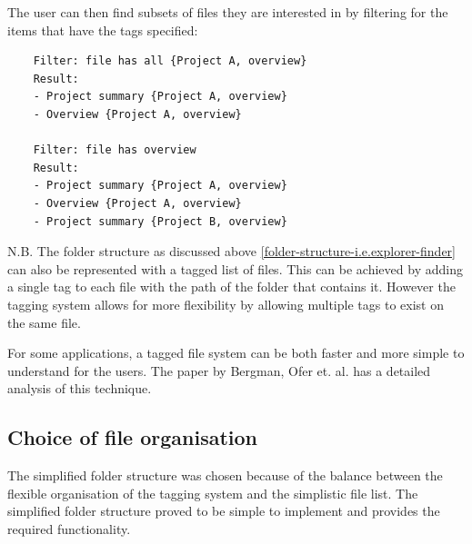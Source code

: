 The user can then find subsets of files they are interested in by
filtering for the items that have the tags specified:

\begin{verbatim}
    Filter: file has all {Project A, overview}
    Result:
    - Project summary {Project A, overview}
    - Overview {Project A, overview}

    Filter: file has overview
    Result:
    - Project summary {Project A, overview}
    - Overview {Project A, overview}
    - Project summary {Project B, overview}
\end{verbatim}

N.B. The folder structure as discussed above
\ref{folder-structure-i.e.explorer-finder} can also be represented with a tagged list
of files. This can be achieved by adding a single tag to each file with the path
of the folder that contains it. However the tagging system allows for more
flexibility by allowing multiple tags to exist on the same file.

For some applications, a tagged file system can be both faster and more simple
to understand for the users. The paper by Bergman, Ofer et. al.\cite{ASI:ASI22906}
has a detailed analysis of this technique.

\subsection{Choice of file organisation}\label{choice-of-file-organization}

The simplified folder structure was chosen because of the balance
between the flexible organisation of the tagging system and the
simplistic file list. The simplified folder structure proved to be
simple to implement and provides the required functionality.


